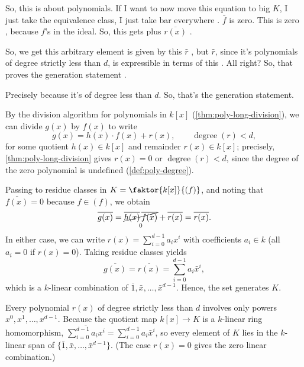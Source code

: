 \begin{proofWrapper}
\begin{speech}[00:06:20 - 00:07:57]
So, this is about polynomials. If I want to now move this equation to big $K$, I just take the equivalence class, I just take bar everywhere . $\bar{f}$ is zero. This is zero , because $f$'s in the ideal. So, this gets plus $\overline{r(x)}$ .

So, we get this arbitrary element  is given by this $\bar{r}$ , but $\bar{r}$, since it's polynomials of degree strictly less than $d$, is expressible in terms of this . All right? So, that proves the generation statement .

Precisely because it's of degree less than $d$. So, that's the generation statement.
\end{speech}

\begin{content}
By the division algorithm for polynomials in $k[x]$ (\cref{thm:poly-long-division}), we can divide $g(x)$ by $f(x)$ to write
\[
g(x) = h(x) \cdot f(x) + r(x), \qquad \operatorname{degree}(r) < d,
\]
for some quotient $h(x) \in k[x]$ and remainder $r(x) \in k[x]$; precisely, \cref{thm:poly-long-division} gives $r(x) = 0$ or $\operatorname{degree}(r) < d$, since the degree of the zero polynomial is undefined (\cref{def:poly-degree}).

Passing to residue classes in $K = \faktor{k[x]}{(f)}$, and noting that $\overline{f(x)} = 0$ because $f \in (f)$, we obtain
\[
\overline{g(x)} = \underset{0}{\cancel{\overline{h(x)} \, \overline{f(x)}}} + \overline{r(x)} = \overline{r(x)}.
\]
In either case, we can write $r(x) = \sum_{i=0}^{d-1} a_i x^i$ with coefficients $a_i \in k$ (all $a_i = 0$ if $r(x) = 0$). Taking residue classes yields
\[
\overline{g(x)} = \overline{r(x)} = \sum_{i=0}^{d-1} a_i \bar{x}^i,
\]
which is a $k$-linear combination of $\bar{1}, \bar{x}, \dots, \bar{x}^{d-1}$. Hence, the set generates $K$.

\begin{steps}
Every polynomial $r(x)$ of degree strictly less than $d$ involves only powers $x^0, x^1, \dots, x^{d-1}$. Because the quotient map $k[x] \to K$ is a $k$-linear ring homomorphism, $\overline{\sum_{i=0}^{d-1} a_i x^i} = \sum_{i=0}^{d-1} a_i \bar{x}^i$, so every element of $K$ lies in the $k$-linear span of $\{\bar{1}, \bar{x}, \dots, \bar{x}^{d-1}\}$. (The case $r(x) = 0$ gives the zero linear combination.)
\end{steps}
\end{content}


\end{proofWrapper}
